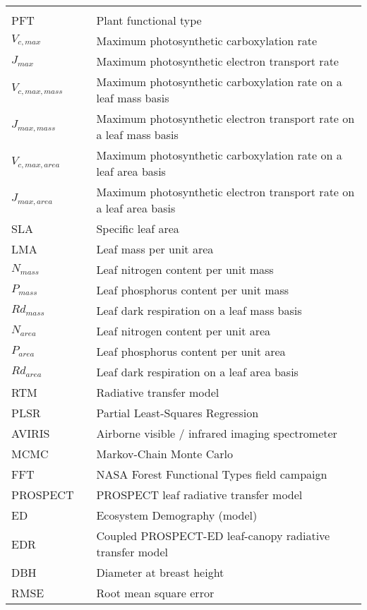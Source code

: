 \begin{center}
  \begin{tabular}{lll}
    \hspace*{2em} & \hspace*{1in} & \hspace*{4.5in} \\
    PFT & \dotfill & Plant functional type \\
    $V_{c,max}$ & \dotfill & Maximum photosynthetic carboxylation rate \\
    $J_{max}$ & \dotfill & Maximum photosynthetic electron transport rate \\
    $V_{c,max,mass}$ & \dotfill & Maximum photosynthetic carboxylation rate on a leaf mass basis \\
    $J_{max,mass}$ & \dotfill & Maximum photosynthetic electron transport rate on a leaf mass basis \\
    $V_{c,max,area}$ & \dotfill & Maximum photosynthetic carboxylation rate on a leaf area basis \\
    $J_{max,area}$ & \dotfill & Maximum photosynthetic electron transport rate on a leaf area basis \\
    SLA & \dotfill & Specific leaf area \\
    LMA & \dotfill & Leaf mass per unit area \\
    $N_{mass}$ & \dotfill & Leaf nitrogen content per unit mass \\
    $P_{mass}$ & \dotfill & Leaf phosphorus content per unit mass \\
    $Rd_{mass}$ & \dotfill & Leaf dark respiration on a leaf mass basis \\
    $N_{area}$ & \dotfill & Leaf nitrogen content per unit area \\
    $P_{area}$ & \dotfill & Leaf phosphorus content per unit area \\
    $Rd_{area}$ & \dotfill & Leaf dark respiration on a leaf area basis \\
    RTM & \dotfill & Radiative transfer model \\
    PLSR & \dotfill & Partial Least-Squares Regression \\
    AVIRIS & \dotfill & Airborne visible / infrared imaging spectrometer \\
    MCMC & \dotfill & Markov-Chain Monte Carlo \\
    FFT & \dotfill & NASA Forest Functional Types field campaign \\
    PROSPECT & \dotfill & PROSPECT leaf radiative transfer model \\
    ED & \dotfill & Ecosystem Demography (model) \\
    EDR & \dotfill & Coupled PROSPECT-ED leaf-canopy radiative transfer model \\
    DBH & \dotfill & Diameter at breast height \\
    RMSE & \dotfill & Root mean square error \\
  \end{tabular}
\end{center}
\cleardoublepage


\newpage
\endofprelim
